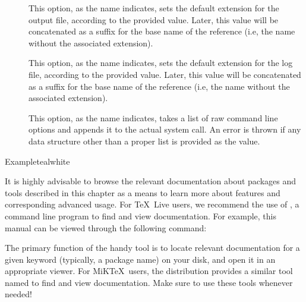 \begin{description}
\begin{description}
\item[] This option, as the name indicates, sets the default extension for the output file, according to the provided value. Later, this value will be concatenated as a suffix for the base name of the  reference (i.e, the name without the associated extension).

\item[] This option, as the name indicates, sets the default extension for the log file, according to the provided value. Later, this value will be concatenated as a suffix for the base name of the  reference (i.e, the name without the associated extension).

\item[] This option, as the name indicates, takes a list of raw command line options and appends it to the actual system call. An error is thrown if any data structure other than a proper list is provided as the value.
\end{description}

\begin{codebox}{Example}{teal}{\icnote}{white}
\end{codebox}
\end{description}

It is highly advisable to browse the relevant documentation about packages and tools described in this chapter as a means to learn more about features and corresponding advanced usage. For \TeX\ Live users, we recommend the use of , a command line program to find and view documentation. For example, this manual can be viewed through the following command:


The primary function of the handy  tool is to locate relevant documentation for a given keyword (typically, a package name) on your disk, and open it in an appropriate viewer. For MiK\TeX\ users, the distribution provides a similar tool named  to find and view documentation. Make sure to use these tools whenever needed!
